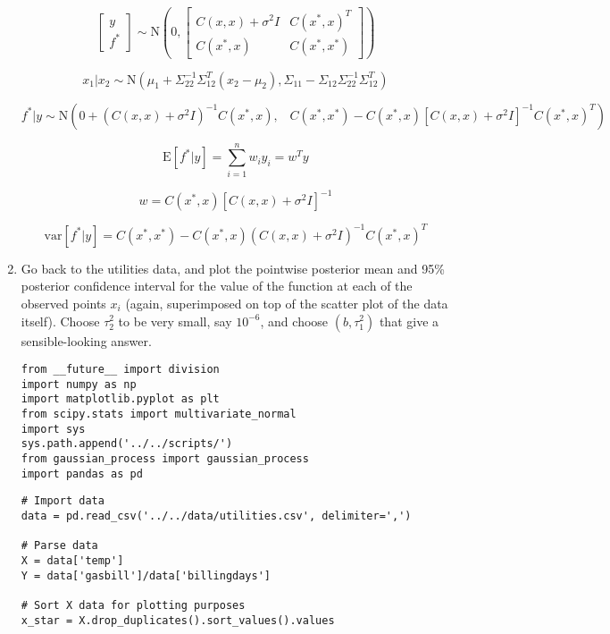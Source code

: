 \documentclass[10pt]{article}
\begin{document}
\begin{enumerate}[label=(\Alph*)]
            $$\begin{bmatrix} y \\ f^* \end{bmatrix} \sim \text{N} \left(0, \begin{bmatrix} C(x, x) + \sigma^2 I & C(x^*, x)^T \\ C(x^*, x) & C(x^*, x^*)\end{bmatrix} \right)$$

            $$x_1 | x_2 \sim \text{N}(\mu_1 + \Sigma_{22}^{-1} \Sigma_{12}^T(x_2 - \mu_2), \Sigma_{11} - \Sigma_{12} \Sigma_{22}^{-1}\Sigma_{12}^T)$$

            $$f^* | y \sim \text{N} \left(0 + (C(x,x) + \sigma^2 I)^{-1} C(x^*, x), \hspace{10pt} C(x^*, x^*) - C(x^*, x) [C(x,x) + \sigma^2 I]^{-1} C(x^*, x)^T \right)$$

            $$\text{E}[f^*|y] = \sum_{i=1}^n w_i y_i= w^T y$$

            $$w = C(x^*, x) [C(x, x) + \sigma^2 I]^{-1}$$

            $$\text{var}[f^*| y] = C(x^*, x^*) - C(x^*, x) ( C(x, x) + \sigma^2 I)^{-1} C(x^*, x)^T$$

            \item Go back to the utilities data, and plot the pointwise posterior mean and 95\% posterior confidence interval for the value of the function at each of the observed points $x_i$ (again, superimposed on top of the scatter plot of the data itself).  Choose $\tau^2_2$ to be very small, say $10^{-6}$, and choose $(b, \tau^2_1)$ that give a sensible-looking answer.

        \begin{lstlisting}
from __future__ import division
import numpy as np 
import matplotlib.pyplot as plt
from scipy.stats import multivariate_normal
import sys
sys.path.append('../../scripts/')
from gaussian_process import gaussian_process
import pandas as pd
        \end{lstlisting}

        \begin{lstlisting}
# Import data
data = pd.read_csv('../../data/utilities.csv', delimiter=',')

# Parse data
X = data['temp']
Y = data['gasbill']/data['billingdays']

# Sort X data for plotting purposes
x_star = X.drop_duplicates().sort_values().values
        \end{lstlisting}


\end{enumerate}
\end{document}
